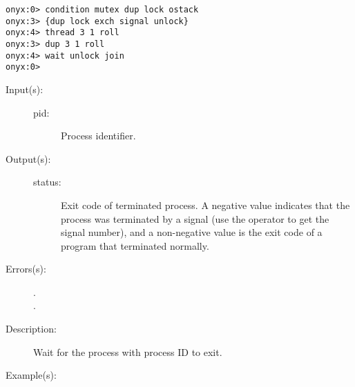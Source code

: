 \begin{description}
\begin{description}
\begin{verbatim}
onyx:0> condition mutex dup lock ostack
onyx:3> {dup lock exch signal unlock}
onyx:4> thread 3 1 roll
onyx:3> dup 3 1 roll
onyx:4> wait unlock join
onyx:0>
		\end{verbatim}
	\end{description}
\label{systemdict:waitpid}
\item[{\onyxop{pid}{waitpid}{status}}: ]
	\begin{description}\item[]
	\item[Input(s): ]
		\begin{description}\item[]
		\item[pid: ]
			Process identifier.
		\end{description}
	\item[Output(s): ]
		\begin{description}\item[]
		\item[status: ]
			Exit code of terminated process.  A negative value
			indicates that the process was terminated by a signal
			(use the 
			operator to get the signal number), and a non-negative
			value is the exit code of a program that terminated
			normally.
		\end{description}
	\item[Errors(s): ]
		\begin{description}\item[]
		\item[.]
		\item[.]
		\end{description}
	\item[Description: ]
		Wait for the process with process ID  to exit.
	\item[Example(s): ]\begin{verbatim}


\end{verbatim}
\end{description}
\end{description}
